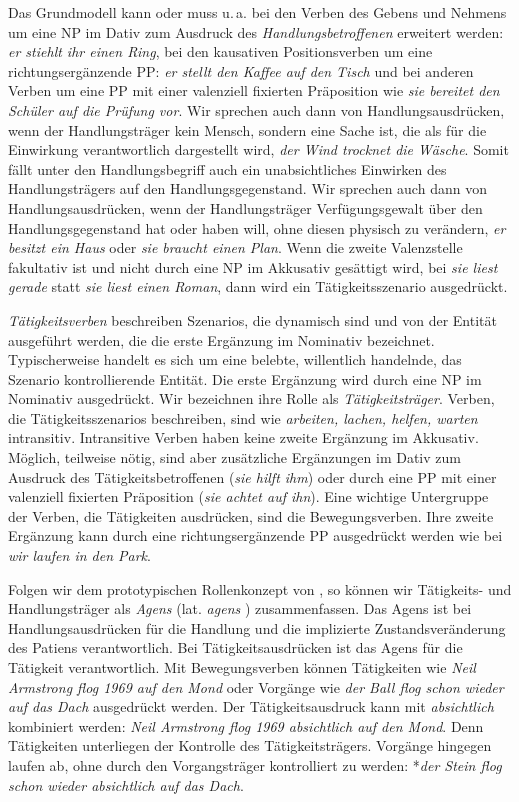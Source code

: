 Das Grundmodell kann oder muss u.\,a. bei den Verben des Gebens und Nehmens um eine NP im Dativ zum Ausdruck des \textit{Handlungsbetroffenen} erweitert werden: \textit{er stiehlt ihr einen Ring}, bei den kausativen Positionsverben um eine richtungsergänzende PP: \textit{er stellt den Kaffee auf den Tisch} und bei anderen Verben um eine PP mit einer valenziell fixierten Präposition wie \textit{sie bereitet den Schüler auf die Prüfung vor}.
Wir sprechen auch dann von Handlungsausdrücken, wenn der Handlungsträger kein Mensch, sondern eine Sache ist, die als für die Einwirkung verantwortlich dargestellt wird, \zB \textit{der Wind trocknet die Wäsche}. Somit fällt unter den Handlungsbegriff auch ein unabsichtliches Einwirken des Handlungsträgers auf den Handlungsgegenstand. Wir sprechen auch dann von Handlungsausdrücken, wenn der Handlungsträger Verfügungsgewalt über den Handlungsgegenstand hat oder haben will, ohne diesen physisch zu verändern, \zB \textit{er besitzt ein Haus} oder \textit{sie braucht einen Plan}. Wenn die zweite Valenzstelle fakultativ ist und nicht durch eine NP im Akkusativ gesättigt wird, \zB bei \textit{sie liest gerade} statt \textit{sie liest einen Roman}, dann wird ein Tätigkeitsszenario ausgedrückt.

\textit{Tätigkeitsverben} beschreiben Szenarios, die dynamisch sind und von der Entität ausgeführt werden, die die erste Ergänzung im Nominativ bezeichnet. Typischerweise handelt es sich um eine belebte, willentlich handelnde, das Szenario kontrollierende Entität. Die erste Ergänzung wird durch eine NP im Nominativ ausgedrückt. Wir bezeichnen ihre Rolle als \textit{Tätigkeitsträger}. Verben, die Tätigkeitsszenarios beschreiben, sind wie \textit{arbeiten, lachen, helfen, warten} intransitiv. Intransitive Verben haben keine zweite Ergänzung im Akkusativ. Möglich, teilweise nötig, sind aber zusätzliche Ergänzungen im Dativ zum Ausdruck des Tätigkeitsbetroffenen (\textit{sie hilft ihm}) oder durch eine PP mit einer valenziell fixierten Präposition (\textit{sie achtet auf ihn}). Eine wichtige Untergruppe der Verben, die Tätigkeiten ausdrücken, sind die Bewegungsverben. Ihre zweite Ergänzung kann durch eine richtungsergänzende PP ausgedrückt werden wie bei \textit{wir laufen in den Park}.

Folgen wir dem prototypischen Rollenkonzept von \citet[572]{Dowty1991}, so können wir Tätigkeits- und Handlungsträger als \textit{Agens} (lat. \textit{agens} ) zusammenfassen. Das Agens ist bei Handlungsausdrücken für die Handlung und die implizierte Zustandsveränderung des Patiens verantwortlich. Bei Tätigkeitsausdrücken ist das Agens für die Tätigkeit verantwortlich. Mit Bewegungsverben können Tätigkeiten wie \textit{Neil Armstrong flog 1969 auf den Mond} oder Vorgänge wie \textit{der Ball flog schon wieder auf das Dach} ausgedrückt werden. Der Tätigkeitsausdruck kann mit \textit{absichtlich} kombiniert werden: \textit{Neil Armstrong flog 1969 absichtlich auf den Mond}. Denn Tätigkeiten unterliegen der Kontrolle des Tätigkeitsträgers. Vorgänge hingegen laufen ab, ohne durch den Vorgangsträger kontrolliert zu werden: *\textit{der Stein flog schon wieder absichtlich auf das Dach}.   

